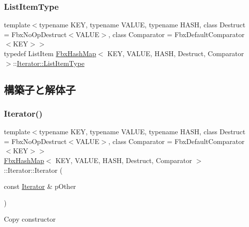 \mbox{\label{class_fbx_hash_map_1_1_iterator_a586b3cba7926b5b3cc39b9f581fdeb3f}} 
\subsubsection{\texorpdfstring{List\+Item\+Type}{ListItemType}}
{\footnotesize\ttfamily template$<$typename K\+EY, typename V\+A\+L\+UE, typename H\+A\+SH, class Destruct = Fbx\+No\+Op\+Destruct$<$\+V\+A\+L\+U\+E$>$, class Comparator = Fbx\+Default\+Comparator$<$\+K\+E\+Y$>$$>$ \\
typedef List\+Item \hyperlink{class_fbx_hash_map}{Fbx\+Hash\+Map}$<$ K\+EY, V\+A\+L\+UE, H\+A\+SH, Destruct, Comparator $>$\+::\hyperlink{class_fbx_hash_map_1_1_iterator_a586b3cba7926b5b3cc39b9f581fdeb3f}{Iterator\+::\+List\+Item\+Type}}



\subsection{構築子と解体子}
\mbox{\label{class_fbx_hash_map_1_1_iterator_a481aed412a6d384dfc6757d6f95e7b23}} 
\subsubsection{\texorpdfstring{Iterator()}{Iterator()}}
{\footnotesize\ttfamily template$<$typename K\+EY, typename V\+A\+L\+UE, typename H\+A\+SH, class Destruct = Fbx\+No\+Op\+Destruct$<$\+V\+A\+L\+U\+E$>$, class Comparator = Fbx\+Default\+Comparator$<$\+K\+E\+Y$>$$>$ \\
\hyperlink{class_fbx_hash_map}{Fbx\+Hash\+Map}$<$ K\+EY, V\+A\+L\+UE, H\+A\+SH, Destruct, Comparator $>$\+::Iterator\+::\+Iterator (\begin{DoxyParamCaption}\item[{const \hyperlink{class_fbx_hash_map_1_1_iterator}{Iterator} \&}]{p\+Other }\end{DoxyParamCaption})}

Copy constructor \mbox{\label{class_fbx_hash_map_1_1_iterator_ad8ad3f62e162fecdc73305f0221e54a2}} 
